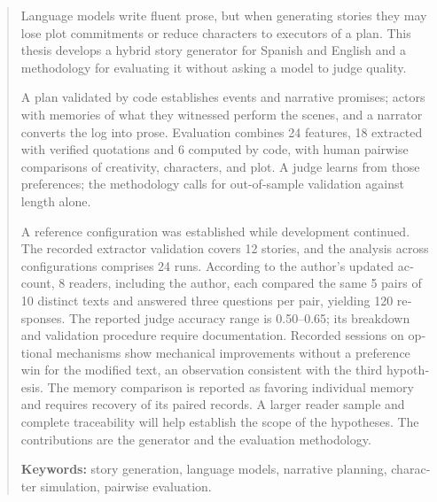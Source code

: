 \begin{abstract}
\begin{otherlanguage}{english}
Language models write fluent prose, but when generating stories they may lose plot commitments or
reduce characters to executors of a plan. This thesis develops a hybrid story generator for Spanish
and English and a methodology for evaluating it without asking a model to judge quality.

A plan validated by code establishes events and narrative promises; actors with memories of what
they witnessed perform the scenes, and a narrator converts the log into prose. Evaluation combines
24 features, 18 extracted with verified quotations and 6 computed by code, with human pairwise
comparisons of creativity, characters, and plot. A judge learns from those preferences; the
methodology calls for out-of-sample validation against length alone.

A reference configuration was established while development continued. The recorded extractor
validation covers 12 stories, and the analysis across configurations comprises 24 runs. According
to the author's updated account, 8 readers, including the author, each compared the same 5 pairs
of 10 distinct texts and answered three questions per pair, yielding 120 responses. The reported
judge accuracy range is 0.50--0.65; its breakdown and validation procedure require documentation.
Recorded sessions on optional mechanisms show mechanical improvements without a preference win
for the modified text, an observation consistent with the third hypothesis. The memory comparison
is reported as favoring individual memory and requires recovery of its paired records. A larger
reader sample and complete traceability will help establish the scope of the hypotheses. The
contributions are the generator and the evaluation methodology.

\medskip\noindent\textbf{Keywords:} story generation, language models, narrative planning, character
simulation, pairwise evaluation.
\end{otherlanguage}
\end{abstract}
